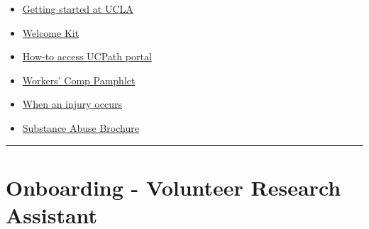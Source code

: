 \documentclass[]{book}
\providecommand{\tightlist}{%
  \setlength{\itemsep}{0pt}\setlength{\parskip}{0pt}}
\begin{document}
\begin{itemize}
\tightlist
\item
  \href{https://www.chr.ucla.edu/new-employee/getting-started}{Getting started at UCLA}
\item
  \href{https://ucnet.universityofcalifornia.edu/forms/pdf/welcome-kit.pdf}{Welcome Kit}
\item
  \href{https://www.centralresourceunit.ucla.edu/s/}{How-to access UCPath portal}
\item
  \href{https://ucla.app.box.com/s/jyzoag8v9qw6katuvgegjil8an2tsx2j}{Workers' Comp
  Pamphlet}
\item
  \href{https://ucla.app.box.com/s/nua4ypfpjlt1226fusney4zyvo6qzzhj}{When an injury occurs}
\item
  \href{https://ucla.app.box.com/s/qrj4j7bnca1r8fy9n1bdfdf6orf1g0dq}{Substance Abuse Brochure}
\end{itemize}

\begin{center}\rule{0.5\linewidth}{0.5pt}\end{center}

\hypertarget{onboarding---volunteer-research-assistant}{%
\section{Onboarding - Volunteer Research Assistant}\label{onboarding---volunteer-research-assistant}}
\end{document}
